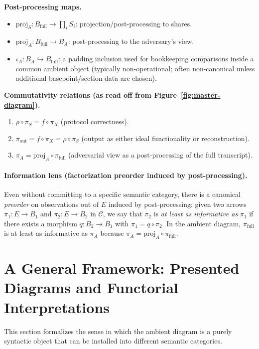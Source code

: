 \documentclass[11pt,a4paper]{article}
\theoremstyle{definition}
\theoremstyle{plain}
\begin{document}
\textbf{Post-processing maps.}
\begin{itemize}
    \item $\mathrm{proj}_S: B_{\mathrm{full}} \to \prod_i S_i$: projection/post-processing to shares.
    \item $\mathrm{proj}_A: B_{\mathrm{full}} \to B_A$: post-processing to the adversary's view.
    \item $\iota_A: B_A \hookrightarrow B_{\mathrm{full}}$: a padding inclusion used for bookkeeping comparisons inside a common ambient object (typically non-operational; often non-canonical unless additional basepoint/section data are chosen).
\end{itemize}

\textbf{Commutativity relations (as read off from Figure~\ref{fig:master-diagram}).}
\begin{enumerate}
    \item $\rho \circ \pi_S = f \circ \pi_X$ (protocol correctness).
    \item $\pi_{\mathrm{out}} = f \circ \pi_X = \rho \circ \pi_S$ (output as either ideal functionality or reconstruction).
    \item $\pi_A = \mathrm{proj}_A \circ \pi_{\mathrm{full}}$ (adversarial view as a post-processing of the full transcript).
\end{enumerate}

\paragraph{Information lens (factorization preorder induced by post-processing).}
Even without committing to a specific semantic category, there is a canonical \emph{preorder} on observations out of $E$ induced by post-processing:
given two arrows $\pi_1:E\to B_1$ and $\pi_2:E\to B_2$ in $\mathcal{C}$, we say that $\pi_2$ is \emph{at least as informative as} $\pi_1$ if there exists a morphism $q:B_2\to B_1$ with $\pi_1=q\circ \pi_2$.
In the ambient diagram, $\pi_{\mathrm{full}}$ is at least as informative as $\pi_A$ because $\pi_A=\mathrm{proj}_A\circ \pi_{\mathrm{full}}$.

\section{A General Framework: Presented Diagrams and Functorial Interpretations}
\label{sec:general-framework}

This section formalizes the sense in which the ambient diagram is a purely syntactic object that can be installed into different semantic categories.
\end{document}

